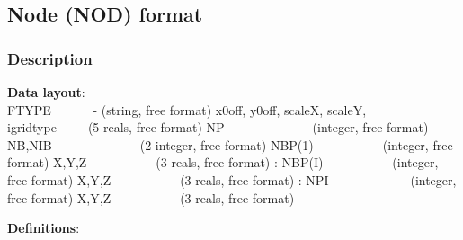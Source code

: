 \documentclass{article}
\begin{document}
\newpage
\subsection[Node (NOD) format]{Node (NOD) format}

\subsubsection[Description]{Description}

\textbf{Data layout}: \\ 

\noindent
FTYPE \ \ \ \ \ \  {}- (string, free format) \newline
x0off, y0off, scaleX, scaleY, igridtype\ \ \ \ \ (5 reals, free format)\newline
NP \ \ \ \ \ \ \ \ \ \ \ \ {}- (integer, free format)\newline
NB,NIB \ \ \ \ \ \ \ \ \ \ \ \ {}- (2 integer, free format)\newline
NBP(1) \ \ \ \ \ \ \ \ \ {}- (integer, free format)\newline
X,Y,Z \ \ \ \ \ \ \ \ \ {}- (3 reals, free format)\newline
:\newline
NBP(I) \ \ \ \ \ \ \ \ \ {}- (integer, free format)\newline
X,Y,Z \ \ \ \ \ \ \ \ \ {}- (3 reals, free format)\newline
:\newline
NPI \ \ \ \ \ \ \ \ \ \ \ {}- (integer, free format)\newline
X,Y,Z \ \ \ \ \ \ \ \ \ {}- (3 reals, free format)\newline

\noindent\textbf{Definitions}:\\ 
\end{document}
